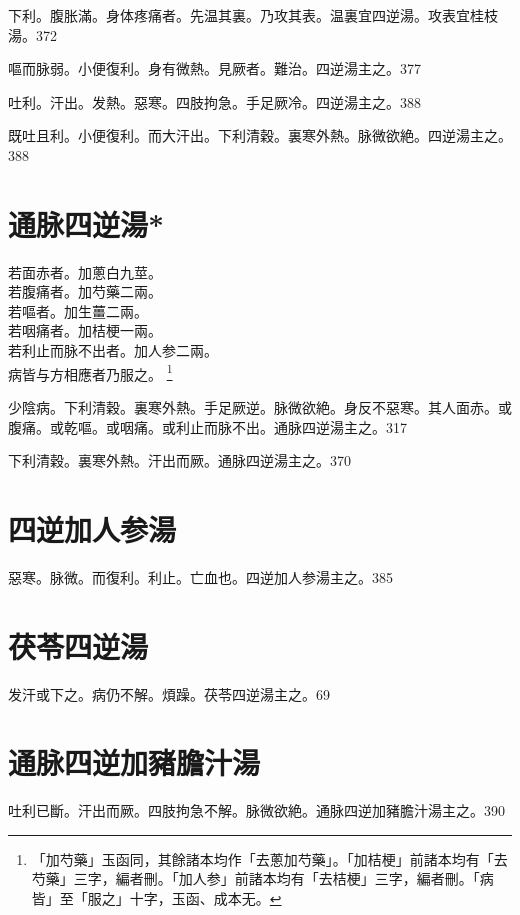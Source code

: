 \documentclass[b5paper,twoside,zihao=-4,UTF8]{ctexbook}
\begin{document}
下利。腹{胀}滿。身体疼痛者。先温其裏。乃攻其表。温裏宜四逆湯。攻表宜桂枝湯。372

嘔而脉弱。小便復利。身有微熱。見厥者。難治。四逆湯主之。377

吐利。汗出。发熱。惡寒。四肢拘急。手足厥冷。四逆湯主之。388

既吐且利。小便復利。而大汗出。下利清穀。裏寒外熱。脉微欲絶。四逆湯主之。388

\section{通脉四逆湯*}

{若}面赤者。加蔥{白}九莖。\\
{若}腹痛者。加芍藥二兩。\\
{若}嘔者。加生薑二兩。\\
{若}咽痛者。加桔梗一兩。\\
{若}利止而脉不出者。加人参二兩。\\
{病皆与方相應者乃服之。}
	\footnote{「加芍藥」玉函同，其餘諸本均作「去蔥加芍藥」。「加桔梗」前諸本均有「去芍藥」三字，編者刪。「加人参」前諸本均有「去桔梗」三字，編者刪。「病皆」至「服之」十字，玉函、成本无。}

少陰病。下利清穀。裏寒外熱。手足厥逆。脉微欲絶。身反不惡寒。其人面赤。或腹痛。或乾嘔。或咽痛。或利止而脉不出。通脉四逆湯主之。317

下利清穀。裏寒外熱。汗出而厥。通脉四逆湯主之。370

\section{四逆加人参湯}

惡寒。脉微。而復利。利止。亡血也。四逆加人参湯主之。385

\section{茯苓四逆湯}

发汗或下之。{病仍}不解。煩躁。茯苓四逆湯主之。69

\section{通脉四逆加豬膽汁湯}

吐利已斷。汗出而厥。四肢拘急不解。脉微欲絶。通脉四逆加豬膽汁湯主之。390
\end{document}
